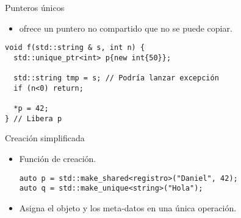 \begin{frame}[t,fragile]{Punteros únicos}
\begin{itemize}
  \item {} ofrece un puntero no compartido que no se puede copiar.
\end{itemize}

\begin{lstlisting}
void f(std::string & s, int n) {
  std::unique_ptr<int> p{new int{50}};

  std::string tmp = s; // Podría lanzar excepción
  if (n<0) return;

  *p = 42;
} // Libera p
\end{lstlisting}
\end{frame}

\begin{frame}[t,fragile]{Creación simplificada}
\begin{itemize}
  \item Función de creación.
\begin{lstlisting}
auto p = std::make_shared<registro>("Daniel", 42);
auto q = std::make_unique<string>("Hola");
\end{lstlisting}
  \item Asigna el objeto y los meta-datos en una única operación.
\end{itemize}
\end{frame}

